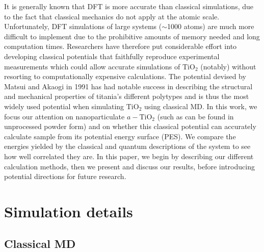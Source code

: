 \documentclass[aps,prb,twocolumn,amsmath,amssymb,superscriptaddress,longbibliography]{revtex4-1}
\begin{document}
It is generally known that DFT is more accurate than classical simulations, due to the fact that classical mechanics do not apply at the atomic scale.
Unfortunately, DFT simulations of large systems ($\sim$1000 atoms) are much more difficult to implement due to the prohibitive amounts of memory needed and long computation times.
Researchers have therefore put considerable effort into developing classical potentials that faithfully reproduce experimental measurements which could allow accurate simulations of $\text{TiO}_2$ (notably) without resorting to computationally expensive calculations\cite{kim,MA_og,opt_FF}.
The potential devised by Matsui and Akaogi in 1991\cite{MA_og} has had notable success in describing the structural and mechanical properties of titania's different polytypes\cite{smith_collins,vvh2007} and is thus the most widely used potential when simulating $\text{TiO}_2$ using classical MD. 
In this work, we focus our attention on nanoparticulate $a-\text{TiO}_2$ (such as can be found in unprocessed powder form) and on whether this classical potential can accurately calculate sample from its potential energy surface (PES).
We compare the energies yielded by the classical and quantum descriptions of the system to see how well correlated they are.
In this paper, we begin by describing our different calculation methods, then we present and discuss our results, before introducing potential directions for future research.




\section*{Simulation details}

\subsection{Classical MD}
\end{document}
